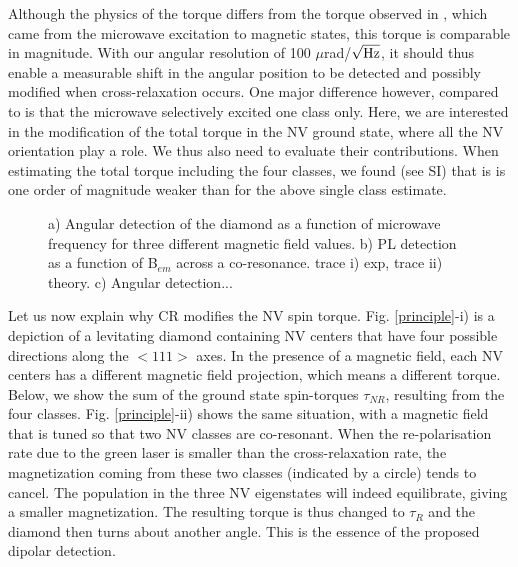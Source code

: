 \documentclass[preprintnumbers,amsmath,amssymb,superscriptaddress,twocolumn,showpacs]{revtex4-1}
\begin{document}
Although the physics of the torque differs from the torque observed in \cite{DelordNat}, which came from the microwave excitation to magnetic states, this torque is comparable in magnitude. With our angular resolution of 100 $\mu$rad/$\sqrt{\rm Hz}$, it should thus enable a measurable shift in the angular position to be detected and possibly modified when cross-relaxation occurs. 
One major difference however, compared to \cite{DelordNat} is that the microwave selectively excited one class only. 
Here, we are interested in the modification of the total torque in the NV ground state, where all the NV orientation play a role. We thus also need to evaluate their contributions.
When estimating the total torque including the four classes, we found (see SI) that is is one order of magnitude weaker than for the above single class estimate.

\begin{figure*}[!ht]
  \centering {}
  \caption{a) Angular detection of the diamond as a function of microwave frequency for three different magnetic field values. 
b) PL detection as a function of B$_{em}$ across a co-resonance. trace i) exp, trace ii) theory. 
c) Angular detection... 
  }
  \label{data}
\end{figure*}

Let us now explain why CR modifies the NV spin torque.
Fig. \ref{principle}-i) is a depiction of a levitating diamond containing NV centers that have four possible directions along the $<111>$ axes. 
In the presence of a magnetic field, each NV centers has a different magnetic field projection, which means a different torque. 
Below, we show the sum of the ground state spin-torques $\tau_{NR}$, resulting from the four classes. 
Fig. \ref{principle}-ii) shows the same situation, with a magnetic field that is tuned so that two NV classes are co-resonant. 
When the re-polarisation rate due to the green laser is smaller than the cross-relaxation rate, the magnetization coming from these two classes (indicated by a circle) tends to cancel. The population in the three NV eigenstates will indeed equilibrate, giving a smaller magnetization.
The resulting torque is thus changed to $\tau_{R}$ and the diamond then turns about another angle.
This is the essence of the proposed dipolar detection. 

\end{document}
